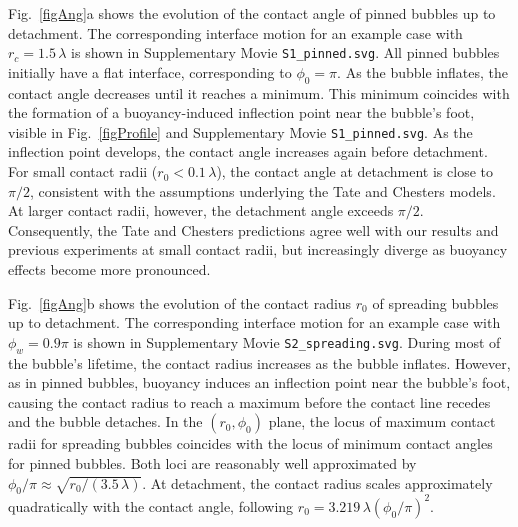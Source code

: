 \documentclass[9pt]{extarticle}
\begin{document}
Fig.~\ref{figAng}a shows the evolution of the contact angle of pinned bubbles up to detachment. The corresponding interface motion for an example case with $r_c=1.5\,\lambda$ is shown in Supplementary Movie \texttt{S1\_pinned.svg}. All pinned bubbles initially have a flat interface, corresponding to $\phi_0=\pi$. As the bubble inflates, the contact angle decreases until it reaches a minimum. This minimum coincides with the formation of a buoyancy-induced inflection point near the bubble's foot, visible in Fig.~\ref{figProfile} and Supplementary Movie \texttt{S1\_pinned.svg}. As the inflection point develops, the contact angle increases again before detachment. For small contact radii ($r_0<0.1\,\lambda$), the contact angle at detachment is close to $\pi/2$, consistent with the assumptions underlying the Tate and Chesters models\cite{tate64magnitude,chesters77analytical}. At larger contact radii, however, the detachment angle exceeds $\pi/2$. Consequently, the Tate and Chesters predictions agree well with our results and previous experiments\cite{lesage13experimental,mori01bubble,sasetty23stability,gunde01measurement} at small contact radii, but increasingly diverge as buoyancy effects become more pronounced.

Fig.~\ref{figAng}b shows the evolution of the contact radius $r_0$ of spreading bubbles up to detachment. The corresponding interface motion for an example case with $\phi_w=0.9\pi$ is shown in Supplementary Movie \texttt{S2\_spreading.svg}. During most of the bubble's lifetime, the contact radius increases as the bubble inflates. However, as in pinned bubbles, buoyancy induces an inflection point near the bubble's foot, causing the contact radius to reach a maximum before the contact line recedes and the bubble detaches. In the $(r_0,\phi_0)$ plane, the locus of maximum contact radii for spreading bubbles coincides with the locus of minimum contact angles for pinned bubbles. Both loci are reasonably well approximated by $\phi_0/\pi\approx\sqrt{r_0/(3.5\,\lambda)}$. At detachment, the contact radius scales approximately quadratically with the contact angle, following $r_0=3.219\,\lambda(\phi_0/\pi)^2$.
\end{document}
